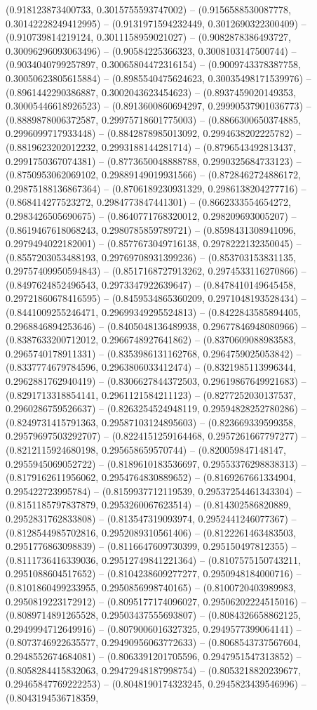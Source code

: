 (0.918123873400733, 0.3015755593747002) -- (0.9156588530087778, 0.30142228249412995) -- (0.9131971594232449, 0.3012690322300409) -- (0.910739814219124, 0.3011158959021027) -- (0.9082878386493727, 0.30096296093063496) -- (0.90584225366323, 0.3008103147500744) -- (0.9034040799257897, 0.30065804472316154) -- (0.9009743378387758, 0.30050623805615884) -- (0.8985540475624623, 0.30035498171539976) -- (0.8961442290386887, 0.3002043623454623) -- (0.8937459020149353, 0.30005446618926523) -- (0.8913600860694297, 0.29990537901036773) -- (0.8889878006372587, 0.29975718601775003) -- (0.8866300650374885, 0.2996099717933448) -- (0.8842878985013092, 0.2994638202225782) -- (0.8819623202012232, 0.2993188144281714) -- (0.8796543492813437, 0.2991750367074381) -- (0.8773650048888788, 0.2990325684733123) -- (0.8750953062069102, 0.29889149019931566) -- (0.8728462724886172, 0.29875188136867364) -- (0.8706189230931329, 0.2986138204277716) -- (0.868414277523272, 0.2984773847441301) -- (0.8662333554654272, 0.2983426505690675) -- (0.8640771768320012, 0.298209693005207) -- (0.8619467618068243, 0.2980785859789721) -- (0.8598431308941096, 0.2979494022182001) -- (0.8577673049716138, 0.2978222132350045) -- (0.8557203053488193, 0.29769708931399236) -- (0.853703153831135, 0.29757409950594843) -- (0.8517168727913262, 0.2974533116270866) -- (0.8497624852496543, 0.2973347922639647) -- (0.8478410149645458, 0.29721860678416595) -- (0.8459534865360209, 0.2971048193528434) -- (0.8441009255246471, 0.29699349295524813) -- (0.8422843585894405, 0.2968846894253646) -- (0.8405048136489938, 0.29677846948080966) -- (0.8387633200712012, 0.2966748927641862) -- (0.8370609088983583, 0.2965740178911331) -- (0.8353986131162768, 0.2964759025053842) -- (0.8337774679784596, 0.2963806033412474) -- (0.8321985113996344, 0.2962881762940419) -- (0.8306627844372503, 0.29619867649921683) -- (0.8291713318854141, 0.2961121584211123) -- (0.8277252030137537, 0.2960286759526637) -- (0.8263254524948119, 0.29594828252780286) -- (0.8249731415791363, 0.29587103124895603) -- (0.823669339599358, 0.29579697503292707) -- (0.8224151259164468, 0.2957261667797277) -- (0.8212115924680198, 0.295658659570744) -- (0.820059847148147, 0.2955945069052722) -- (0.8189610183536697, 0.29553376298838313) -- (0.8179162611956062, 0.2954764830889652) -- (0.8169267661334904, 0.295422723995784) -- (0.8159937712119539, 0.29537254461343304) -- (0.8151185797837879, 0.2953260067623514) -- (0.814302586820889, 0.2952831762833808) -- (0.813547319093974, 0.2952441246077367) -- (0.8128544985702816, 0.2952089310561406) -- (0.8122261463483503, 0.2951776863098839) -- (0.8116647609730399, 0.295150497812355) -- (0.8111736416339036, 0.29512749841221364) -- (0.8107575150743211, 0.2951088604517652) -- (0.8104238609277277, 0.2950948184000716) -- (0.8101860499233955, 0.2950856998740165) -- (0.8100720403989983, 0.2950819223172912) -- (0.8095177174096027, 0.29506202224515016) -- (0.8089714891265528, 0.29503437555693807) -- (0.8084326658862125, 0.2949994712649916) -- (0.8079006016327325, 0.2949577399064141) -- (0.8073746922635577, 0.29490956063772633) -- (0.8068543737567604, 0.2948552674684081) -- (0.8063391201705596, 0.2947951547313852) -- (0.8058284415832063, 0.29472948187998754) -- (0.8053218820239677, 0.29465847769222253) -- (0.8048190174323245, 0.2945823439546996) -- (0.8043194536718359, 